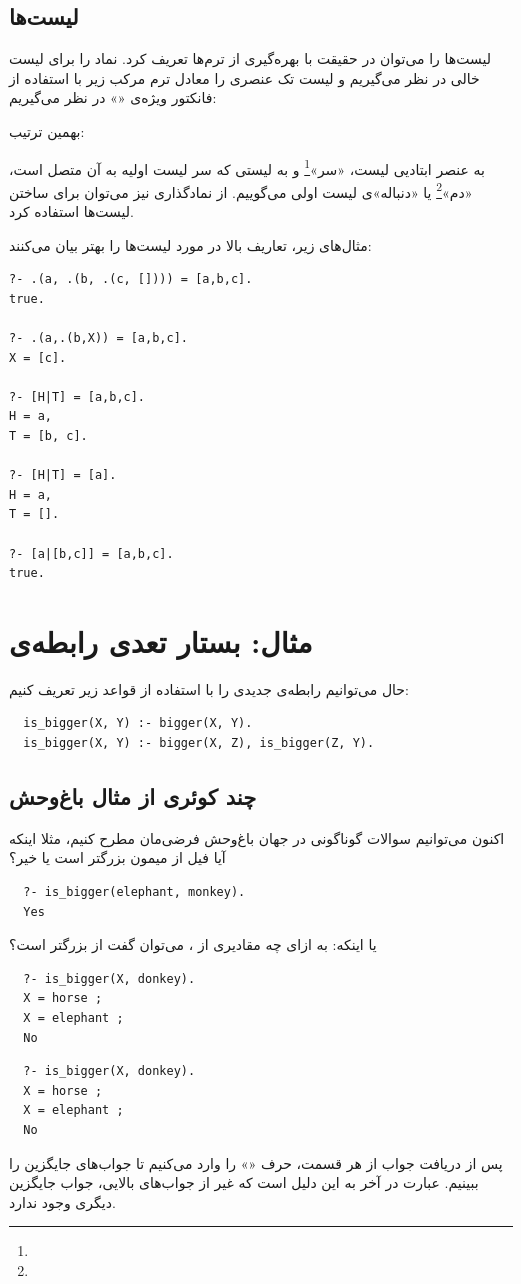 \documentclass{article}
\begin{document}
\subsection{لیست‌ها}
لیست‌ها را می‌توان در حقیقت با بهره‌گیری از ترم‌ها تعریف کرد.
نماد \lr{\tt []} را برای لیست خالی در نظر می‌گیریم و لیست تک عنصری را
معادل ترم مرکب زیر با استفاده از فانکتور ویژه‌ی «» در نظر می‌گیریم:
\begin{center}
\end{center}
بهمین ترتیب:
\begin{center}
\end{center}
به عنصر ابتادیی لیست، «سر»\footnote{} و به لیستی که سر لیست اولیه به آن متصل
است، «دم»\footnote{} یا «دنباله»‌ی لیست اولی می‌گوییم. از نمادگذاری \lr{\tt [H|T]} نیز
می‌توان برای ساختن لیست‌ها استفاده کرد.

\clearpage
مثال‌های زیر، تعاریف بالا در مورد لیست‌ها را بهتر بیان می‌کنند:
\begin{verbatim}
?- .(a, .(b, .(c, []))) = [a,b,c].
true.

?- .(a,.(b,X)) = [a,b,c].
X = [c].

?- [H|T] = [a,b,c].
H = a,
T = [b, c].

?- [H|T] = [a].
H = a,
T = [].

?- [a|[b,c]] = [a,b,c].
true.
\end{verbatim}

\section{مثال: بستار تعدی رابطه‌ی }
حال می‌توانیم رابطه‌ی جدیدی را با استفاده از قواعد زیر تعریف کنیم:
\begin{verbatim}
  is_bigger(X, Y) :- bigger(X, Y).
  is_bigger(X, Y) :- bigger(X, Z), is_bigger(Z, Y).
\end{verbatim}

\subsection{چند کوئری از مثال باغ‌وحش}
اکنون می‌توانیم سوالات گوناگونی در جهان باغ‌وحش فرضی‌مان مطرح کنیم،
مثلا اینکه آیا فیل از میمون بزرگتر است یا خیر؟
\begin{verbatim}
  ?- is_bigger(elephant, monkey).
  Yes
\end{verbatim}
یا اینکه:
به ازای چه مقادیری از ، می‌توان گفت  از  بزرگتر است؟
\begin{verbatim}
  ?- is_bigger(X, donkey).
  X = horse ;
  X = elephant ;
  No
\end{verbatim}
{\Large \bf \* \vspace{3cm} \*
\begin{verbatim}
  ?- is_bigger(X, donkey).
  X = horse ;
  X = elephant ;
  No
\end{verbatim}

\noindent
پس از دریافت جواب از هر قسمت، حرف «\lr{\tt ;}» را وارد می‌کنیم تا جواب‌های جایگزین را ببینیم.
عبارت  در آخر به این دلیل است که غیر از جواب‌های بالایی، جواب جایگزین دیگری وجود ندارد.
}
\clearpage
\end{document}
